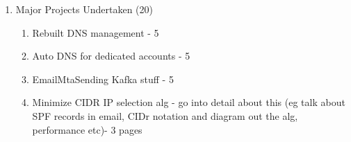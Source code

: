 \begin{enumerate}
    \item Major Projects Undertaken (20)
    \begin{enumerate}
    	\item Rebuilt DNS management - 5
        \item Auto DNS for dedicated accounts - 5
    	\item EmailMtaSending Kafka stuff - 5
    	\item Minimize CIDR IP selection alg - go into detail about this (eg talk about SPF records in email, CIDr notation and diagram out the alg, performance etc)- 3 pages
    \end{enumerate}
    
\end{enumerate}
